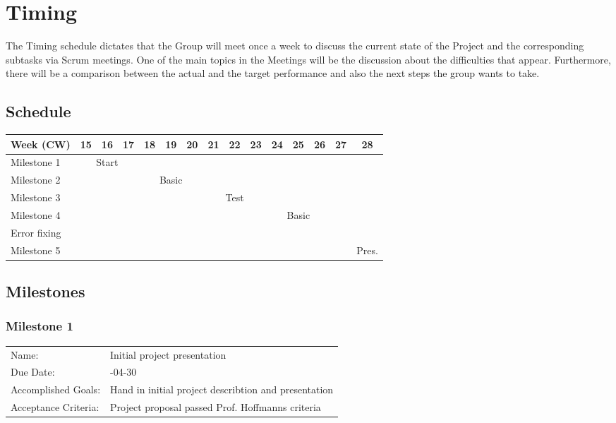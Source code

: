 \documentclass[a4paper, 12pt]{scrartcl}%
\newcommand{\explanation}[1]{{\sffamily #1}}
\begin{document}
\section{Timing}
The Timing schedule dictates that the Group will meet once a week to discuss the current state of the Project and the corresponding subtasks via Scrum meetings. One of the main topics in the Meetings will be the discussion about the difficulties that appear. Furthermore, there will be a comparison between the actual and the target performance and also the next steps the group wants to take.\newline


\subsection*{Schedule}
\begin{center}
	\begin{footnotesize}
		\begin{tabular}{|l|c|c|c|c|c|c|c|c|c|c|c|c|c|c|}
			\hline
			Week (CW) & 15 & 16 & 17 & 18 & 19 & 20 & 21 & 22 & 23 & 24 & 25 & 26 & 27 & 28 \\
			\hline
			Milestone 1      & \multicolumn{3}{c|}{Start}&\multicolumn{11}{c|}{}\\
			\hline
			Milestone 2      & \multicolumn{3}{c|}{}&\multicolumn{3}{c|}{Basic}&\multicolumn{8}{c|}{}\\
			\hline
			Milestone 3      & \multicolumn{6}{c|}{}&\multicolumn{3}{c|}{Test}&\multicolumn{5}{c|}{}\\
			\hline
			Milestone 4      & \multicolumn{9}{c|}{}&\multicolumn{3}{c|}{Basic}&\multicolumn{2}{c|}{}\\
			\hline
			Error fixing     & \multicolumn{12}{c|}{}&\multicolumn{1}{c|}{}&\multicolumn{1}{c|}{}\\
			\hline
			Milestone 5      & \multicolumn{13}{c|}{}&\multicolumn{1}{c|}{Pres.}\\
			\hline
		\end{tabular}
	\end{footnotesize}
\end{center}

\subsection{Milestones}
\subsubsection*{Milestone 1}
\begin{tabular}{lp{10cm}}
	Name:      & \explanation{Initial project presentation}\\
	Due Date: & \explanation{2019-04-30}\\
	Accomplished Goals: & \explanation{Hand in initial project describtion and presentation}\\
	Acceptance Criteria: & \explanation{Project proposal passed Prof. Hoffmanns criteria}
\end{tabular}
\end{document}
